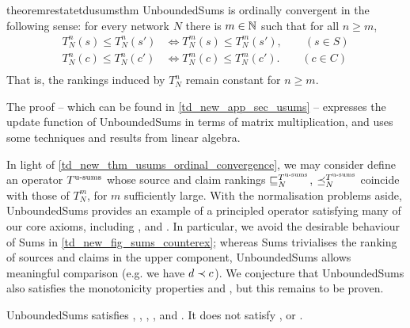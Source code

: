 \begin{restatable}{theorem}{restatetdusumsthm}
    \label{td_new_thm_usums_ordinal_convergence}
    UnboundedSums is ordinally convergent in the following sense: for every
    network $N$ there is $m \in \mathbb{N}$ such that for all $n \ge m$,
    \begin{align*}
        T^n_N(s) \le T^n_N(s') &\iff T^m_N(s) \le T^m_N(s'), \qquad (s \in S) \\
        T^n_N(c) \le T^n_N(c') &\iff T^m_N(c) \le T^m_N(c'). \qquad (c \in C) \\
    \end{align*}
    That is, the rankings induced by $T^n_N$ remain constant for $n \ge m$.
\end{restatable}

The proof -- which can be found in \cref{td_new_app_sec_usums} -- expresses the
update function of UnboundedSums in terms of matrix multiplication, and
uses some techniques and results from linear algebra.

In light of \cref{td_new_thm_usums_ordinal_convergence}, we may consider define
an operator $T^{\operatorname{u-sums}}$ whose source and claim rankings $\sqsubseteq_N^{T^{\operatorname{u-sums}}{}}$,
$\preceq_N^{T^{\operatorname{u-sums}}}$ coincide with those of $T^m_N$, for $m$ sufficiently large.
With the normalisation problems aside, UnboundedSums provides an example of a
principled operator satisfying many of our core axioms, including
\sourcecoherence{}, \claimcoherence{} and \disjointindependence{}. In
particular, we avoid the desirable behaviour of Sums in
\cref{td_new_fig_sums_counterex}; whereas Sums trivialises the ranking of
sources and claims in the upper component, UnboundedSums allows meaningful
comparison (e.g. we have $d \prec c$). We conjecture that UnboundedSums also
satisfies the monotonicity properties \freshposresp{} and \sourceposresp{}, but
this remains to be proven.\footnotemark{}


\begin{theorem}
    UnboundedSums satisfies \sourcecoherence{}, \claimcoherence{}, \symmetry{},
    \marginaltrustworthiness{}, \trustbasedmon{} and \disjointindependence{}.
    It does not satisfy \classicalindependence{}, \conflictcoherence{} or
    \anticoherence{}.
\end{theorem}


